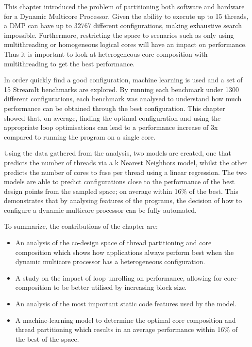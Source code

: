 This chapter introduced the problem of partitioning both software and hardware for a Dynamic Multicore Processor.
Given the ability to execute up to 15 threads, a DMP can have up to 32767 different configurations, making exhaustive search impossible.
Furthermore, restricting the space to scenarios such as only using multithreading or homogeneous logical cores will have an impact on performance.
Thus it is important to look at heterogeneous core-composition with multithreading to get the best performance.

In order quickly find a good configuration, machine learning is used and a set of 15 StreamIt benchmarks are explored.
By running each benchmark under 1300 different configurations, each benchmark was analysed to understand how much performance can be obtained through the best configuration.
This chapter showed that, on average, finding the optimal configuration and using the appropriate loop optimisations can lead to a performance increase of 3x compared to running the program on a single core.

Using the data gathered from the analysis, two models are created, one that predicts the number of threads via a k Nearest Neighbors model, whilst the other predicts the number of cores to fuse per thread using a linear regression.
The two models are able to predict configurations close to the performance of the best design points from the sampled space; on average within 16\% of the best.
This demonstrates that by analysing features of the programs, the decision of how to configure a dynamic multicore processor can be fully automated.

To summarize, the contributions of the chapter are:
\begin{itemize}
\item An analysis of the co-design space of thread partitioning and core composition which shows how applications always perform best when the dynamic multicore processor has a heterogeneous configuration.
\vspace{-1em}
\item A study on the impact of loop unrolling on performance, allowing for core-composition to be better utilised by increasing block size.
\vspace{-1em}
\item An analysis of the most important static code features used by the model.
\vspace{-1em}
\item A machine-learning model to determine the optimal core composition and thread partitioning which results in an average performance within 16\% of the best of the space.
\end{itemize}
